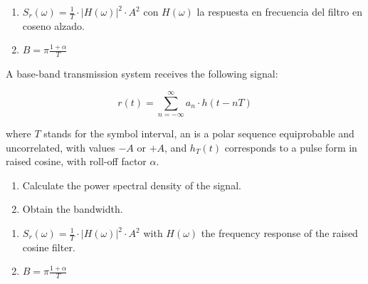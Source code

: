 \documentclass[idioma,boletin]{uah}
\begin{document}
{

\begin{enumerate}
	\item $S_r(\omega) = \frac{1}{T} \cdot |H(\omega)|^2 \cdot A^2$ con $H(\omega)$ la respuesta en frecuencia del filtro en coseno alzado.
	\item $B = \pi \frac{1+\alpha}{T}$
\end{enumerate}
}
{

A base-band transmission system receives the following signal:

\begin{displaymath}
	r(t) = \sum_{n=-\infty}^{\infty} a_n \cdot h(t-nT)
\end{displaymath}

where $T$ stands for the symbol interval, an is a polar sequence equiprobable and uncorrelated, with values $-A$ or $+A$, and $h_T(t)$ corresponds to a pulse form in raised cosine, with roll-off factor $\alpha$.

\begin{enumerate}
	\item Calculate the power spectral density of the signal.
	\item Obtain the bandwidth.
\end{enumerate}
	
}
{

\begin{enumerate}
	\item $S_r(\omega) = \frac{1}{T} \cdot |H(\omega)|^2 \cdot A^2$ with $H(\omega)$ the frequency response of the raised cosine filter.
	\item $B = \pi \frac{1+\alpha}{T}$
\end{enumerate}
}
\end{document}
